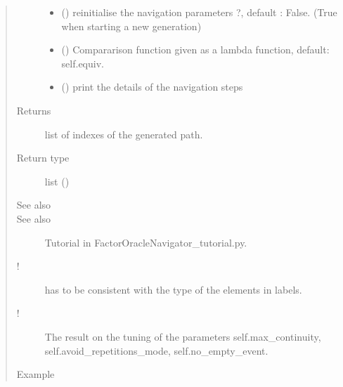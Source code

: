\documentclass[letterpaper,10pt,english]{sphinxmanual}
\begin{document}
\begin{fulllineitems}
\begin{fulllineitems}
\begin{quote}
\begin{description}
\begin{itemize}
\item {} 
 () \textendash{} reinitialise the navigation parameters ?, default : False. (True when starting a new generation)

\item {} 
 () \textendash{} Compararison function given as a lambda function, default: self.equiv.

\item {} 
 () \textendash{} print the details of the navigation steps

\end{itemize}

\item[{Returns}] \leavevmode
list of indexes of the generated path.

\item[{Return type}] \leavevmode
list ()

\item[{See also}] \leavevmode
{}

\item[{See also}] \leavevmode
Tutorial in FactorOracleNavigator\_tutorial.py.

\item[{!}] \leavevmode
{} has to be consistent with the type of the elements in labels.

\item[{!}] \leavevmode
The result  on the tuning of the parameters self.max\_continuity, self.avoid\_repetitions\_mode, self.no\_empty\_event.

\item[{Example}] \leavevmode
\end{description}\end{quote}


\end{fulllineitems}
\end{fulllineitems}
\end{document}
